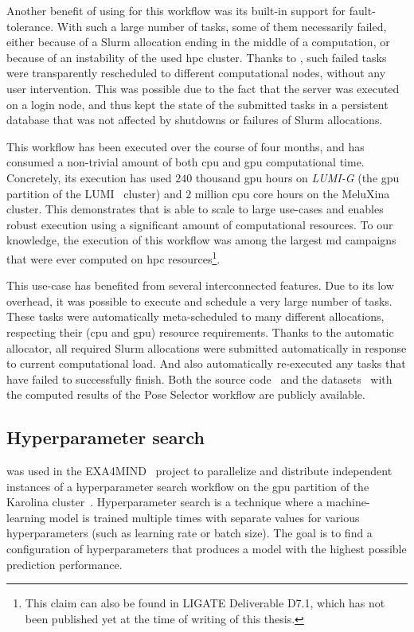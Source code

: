 Another benefit of using \hyperqueue{} for this workflow was its built-in support for
fault-tolerance. With such a large number of tasks, some of them necessarily failed, either because
of a Slurm allocation ending in the middle of a computation, or because of an instability of the
used \gls{hpc} cluster. Thanks to \hyperqueue{}, such failed tasks were
transparently rescheduled to different computational nodes, without any user intervention. This was
possible due to the fact that the \hq{} server was executed on a login node, and
thus kept the state of the submitted tasks in a persistent database that was not affected by
shutdowns or failures of Slurm allocations.

This workflow has been executed over the course of four months, and has consumed a non-trivial
amount of both \gls{cpu} and \gls{gpu} computational time. Concretely,
its execution has used $240$ thousand \gls{gpu} hours on
\emph{LUMI-G}
(the \gls{gpu} partition of the LUMI~\cite{lumi} cluster) and $2$ million \gls{cpu} core hours on
the MeluXina~\cite{meluxina} cluster. This demonstrates that \hyperqueue{} is
able to scale to large use-cases and enables robust execution using a significant amount of
computational resources. To our knowledge, the execution of this workflow was among the largest
\gls{md} campaigns that were ever computed on \gls{hpc}
resources\footnote{This claim can also be found in LIGATE Deliverable D7.1, which has not been published yet at the time of writing of this thesis.}.

This use-case has benefited from several interconnected \hyperqueue{} features. Due to
its low overhead, it was possible to execute and schedule a very large number of tasks. These tasks
were automatically meta-scheduled to many different allocations, respecting their
(\gls{cpu} and \gls{gpu}) resource requirements. Thanks to the
automatic allocator, all required Slurm allocations were submitted automatically in response to
current computational load. And \hyperqueue{} also automatically re-executed any tasks
that have failed to successfully finish. Both the source code~\cite{ps-workflow} and the
datasets~\cite{ps_dataset_1,ps_dataset_2} with the computed results of the Pose Selector workflow are
publicly available.

\subsection{Hyperparameter search}
\hyperqueue{} was used in the EXA4MIND~\cite{exa4mind} project to parallelize and
distribute independent instances of a hyperparameter search workflow on the \gls{gpu}
partition of the Karolina cluster~\cite{karolina}. Hyperparameter search is a technique
where a machine-learning model is trained multiple times with separate values for various
hyperparameters (such as learning rate or batch size). The goal is to find a configuration of
hyperparameters that produces a model with the highest possible prediction performance.

